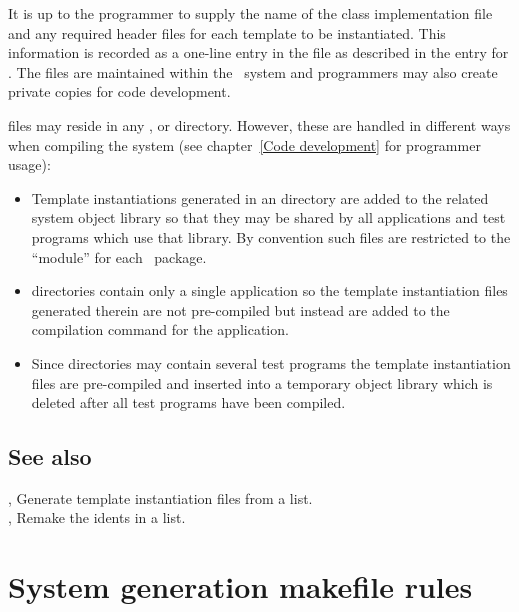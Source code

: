 It is up to the programmer to supply the name of the class implementation file
and any required header files for each template to be instantiated.  This
information is recorded as a one-line entry in the  file as
described in the entry for .  The  files are
maintained within the \aipspp\ system and programmers may also create private
copies for code development.

 files may reside in any ,  or 
directory.  However, these are handled in different ways when compiling the
system (see chapter~\ref{Code development} for programmer usage):
\begin{itemize}
\item
   Template instantiations generated in an  directory are
   added to the related system object library so that they may be shared by
   all applications and test programs which use that library.  By convention
   such  files are restricted to the 
   ``module'' for each \aipspp\ package.
\item
    directories contain only a single application so the template
   instantiation files generated therein are not pre-compiled but instead are
   added to the compilation command for the application.
\item
   Since  directories may contain several test programs the template
   instantiation files are pre-compiled and inserted into a temporary object
   library which is deleted after all test programs have been compiled.
\end{itemize}
 
\subsection*{See also}
 
, Generate template instantiation files from a list.\\
, Remake the idents in a  list.

 
\newpage
\section{System generation makefile rules}
\label{System generation makefile rules}

 
